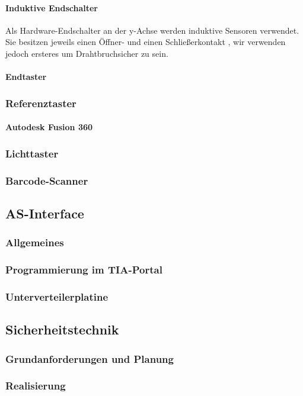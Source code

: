 \paragraph{Induktive Endschalter}
Als Hardware-Endschalter an der y-Achse werden induktive Sensoren verwendet. Sie besitzen jeweils einen Öffner- und einen Schließerkontakt \cite{induktiv_sensor}, wir verwenden jedoch ersteres um Drahtbruchsicher zu sein.

\paragraph{Endtaster}

\subsubsection{Referenztaster}
\paragraph{Autodesk Fusion 360}

\subsubsection{Lichttaster}

\subsubsection{Barcode-Scanner}

\subsection{AS-Interface}

\subsubsection{Allgemeines}

\subsubsection{Programmierung im TIA-Portal}

\subsubsection{Unterverteilerplatine}


\subsection{Sicherheitstechnik}
\subsubsection{Grundanforderungen und Planung}
\subsubsection{Realisierung}